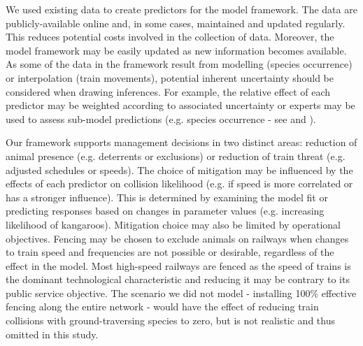 We used existing data to create predictors for the model framework. The data are publicly-available online and, in some cases, maintained and updated regularly. This reduces potential costs involved in the collection of data. Moreover, the model framework may be easily updated as new information becomes available.  As some of the data in the framework result from modelling (species occurrence) or interpolation (train movements), potential inherent uncertainty should be considered when drawing inferences. For example, the relative effect of each predictor may be weighted according to associated uncertainty or experts may be used to assess sub-model predictions (e.g. species occurrence - see \cite{clev02} and \cite{wint05}).

Our framework supports management decisions in two distinct areas: reduction of animal presence (e.g. deterrents or exclusions) or reduction of train threat (e.g. adjusted schedules or speeds).  The choice of mitigation may be influenced by the effects of each predictor on collision likelihood (e.g. if speed is more correlated or has a stronger influence).  This is determined by examining the model fit or predicting responses based on changes in parameter values (e.g. increasing likelihood of kangaroos).  Mitigation choice may also be limited by operational objectives.  Fencing may be chosen to exclude animals on railways when changes to train speed and frequencies are not possible or desirable, regardless of the effect in the model. Most high-speed railways are fenced \citep{camp09} as the speed of trains is the dominant technological characteristic and reducing it may be contrary to its public service objective. The scenario we did not model - installing 100\% effective fencing along the entire network - would have the effect of reducing train collisions with ground-traversing species to zero, but is not realistic and thus omitted in this study.

